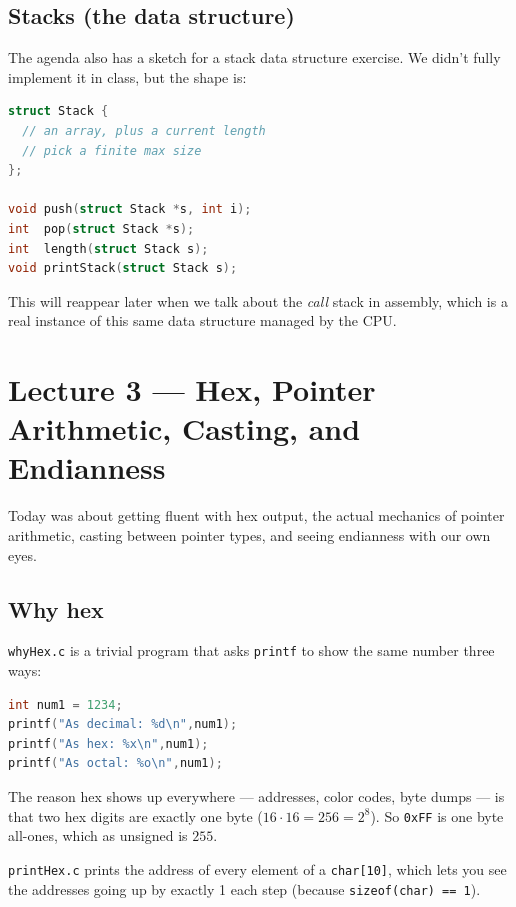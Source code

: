 \documentclass[11pt]{article}
\begin{document}
\subsection*{Stacks (the data structure)}

The agenda also has a sketch for a stack data structure exercise.
We didn't fully implement it in class, but the shape is:

\begin{lstlisting}[language=C]
struct Stack {
  // an array, plus a current length
  // pick a finite max size
};

void push(struct Stack *s, int i);
int  pop(struct Stack *s);
int  length(struct Stack s);
void printStack(struct Stack s);
\end{lstlisting}

This will reappear later when we talk about the \emph{call} stack
in assembly, which is a real instance of this same data structure
managed by the CPU.

\section{Lecture 3 --- Hex, Pointer Arithmetic, Casting, and Endianness}

Today was about getting fluent with hex output, the actual
mechanics of pointer arithmetic, casting between pointer types, and
seeing endianness with our own eyes.

\subsection*{Why hex}

\texttt{whyHex.c} is a trivial program that asks \texttt{printf} to
show the same number three ways:

\begin{lstlisting}[language=C]
int num1 = 1234;
printf("As decimal: %d\n",num1);
printf("As hex: %x\n",num1);
printf("As octal: %o\n",num1);
\end{lstlisting}

The reason hex shows up everywhere --- addresses, color codes, byte
dumps --- is that two hex digits are exactly one byte
($16 \cdot 16 = 256 = 2^8$). So \texttt{0xFF} is one byte all-ones,
which as unsigned is $255$.

\texttt{printHex.c} prints the address of every element of a
\texttt{char[10]}, which lets you see the addresses going up by
exactly 1 each step (because \texttt{sizeof(char) == 1}).
\end{document}
